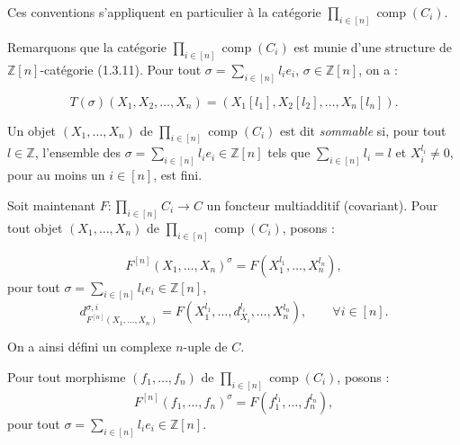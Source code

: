 %
Ces conventions s'appliquent en particulier à la catégorie
$\prod_{i\in[n]}\operatorname{comp}(C_i)$.

Remarquons que la catégorie
$\prod_{i\in[n]}\operatorname{comp}(C_i)$ est munie d'une structure de
$\mathbb Z[n]$-catégorie (1.3.11). Pour tout
$\sigma=\sum_{i\in[n]}l_i e_i$, $\sigma\in\mathbb Z[n]$, on a :

\begin{equation}
  T(\sigma)(X_1,X_2,\ldots,X_n)
  = (X_1[l_1],X_2[l_2],\ldots,X_n[l_n]).
  \tag{2.4.2.1}
\end{equation}

Un objet $(X_1,\ldots,X_n)$ de
$\prod_{i\in[n]}\operatorname{comp}(C_i)$ est dit \emph{sommable} si,
pour tout $l\in\mathbb Z$, l'ensemble des
$\sigma=\sum_{i\in[n]}l_i e_i\in\mathbb Z[n]$ tels que
$\sum_{i\in[n]}l_i=l$ et $X_i^{l_i}\neq0$, pour au moins un
$i\in[n]$, est fini.

Soit maintenant
$F\colon\prod_{i\in[n]}C_i\longrightarrow C$ un foncteur multiadditif
(covariant). Pour tout objet $(X_1,\ldots,X_n)$ de
$\prod_{i\in[n]}\operatorname{comp}(C_i)$, posons :

\begin{equation}
  F^{[n]}(X_1,\ldots,X_n)^\sigma
  =F(X_1^{l_1},\ldots,X_n^{l_n}),
  \tag{2.4.2.2}
\end{equation}
pour tout $\sigma=\sum_{i\in[n]}l_i e_i\in\mathbb Z[n]$,
\begin{equation*}
  d^{\sigma,i}_{F^{[n]}(X_1,\ldots,X_n)}
  =F(X_1^{l_1},\ldots,d_{X_i}^{l_i},\ldots,X_n^{l_n}),
  \qquad \forall i\in[n].
\end{equation*}

On a ainsi défini un complexe $n$-uple de $C$.

Pour tout morphisme $(f_1,\ldots,f_n)$ de
$\prod_{i\in[n]}\operatorname{comp}(C_i)$, posons :
\begin{equation}
  F^{[n]}(f_1,\ldots,f_n)^\sigma
  =F(f_1^{l_1},\ldots,f_n^{l_n}),
  \tag{2.4.2.3}
\end{equation}
pour tout $\sigma=\sum_{i\in[n]}l_i e_i\in\mathbb Z[n]$.

